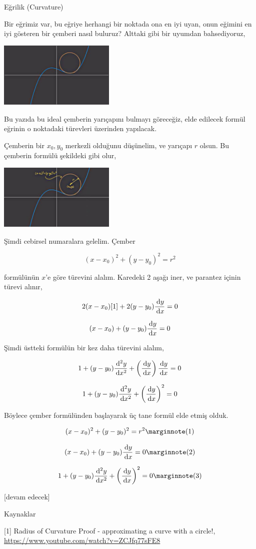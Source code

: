 \documentclass[12pt,fleqn]{article}\usepackage{../../common}
\begin{document}
Eğrilik (Curvature)

Bir eğrimiz var, bu eğriye herhangi bir noktada ona en iyi uyan, onun eğimini en
iyi gösteren bir çemberi nasıl buluruz? Alttaki gibi bir uyumdan bahsediyoruz,

\includegraphics[width=15em]{calc_multi_60_01.jpg}

Bu yazıda bu ideal çemberin yarıçapını bulmayı göreceğiz, elde edilecek
formül eğrinin o noktadaki türevleri üzerinden yapılacak.

Çemberin bir $x_0,y_0$ merkezli olduğunu düşünelim, ve yarıçapı $r$ olsun. Bu
çemberin formülü şekildeki gibi olur,

\includegraphics[width=15em]{calc_multi_60_02.jpg}

Şimdi cebirsel numaralara gelelim. Çember 

$$
(x-x_0)^2 + (y-y_0)^2 = r^2
$$

formülünün $x$'e göre türevini alalım. Karedeki 2 aşağı iner, ve parantez içinin
türevi alınır,

$$
2 (x-x_0) [1] + 2(y-y_0) \frac{\,\mathrm{d} y}{\,\mathrm{d} x} = 0
$$

$$
(x-x_0) + (y-y_0) \frac{\,\mathrm{d} y}{\,\mathrm{d} x} = 0
$$

Şimdi üstteki formülün bir kez daha türevini alalım,

$$
1 + (y-y_0) \frac{\,\mathrm{d}^2y}{\,\mathrm{d} x^2} +
\left(  \frac{\,\mathrm{d} y}{\,\mathrm{d} x}  \right) \frac{\,\mathrm{d} y}{\,\mathrm{d} x}  = 0
$$

$$
1 + (y-y_0) \frac{\,\mathrm{d}^2y}{\,\mathrm{d} x^2} +
\left(  \frac{\,\mathrm{d} y}{\,\mathrm{d} x}  \right)^2 = 0
$$

Böylece çember formülünden başlayarak üç tane formül elde etmiş olduk.

$$
(x-x_0)^2 + (y-y_0)^2 = r^2
\mlabel{1}
$$

$$
(x-x_0) + (y-y_0) \frac{\ud y}{\ud x} = 0
\mlabel{2}
$$

$$
1 + (y-y_0) \frac{\ud^2y}{\ud x^2} +
\left(  \frac{\ud y}{\ud x}  \right)^2 = 0
\mlabel{3}
$$

[devam edecek]

Kaynaklar

[1] Radius of Curvature Proof - approximating a curve with a circle!,
    \url{https://www.youtube.com/watch?v=ZCJfq77sFE8}
\end{document}

